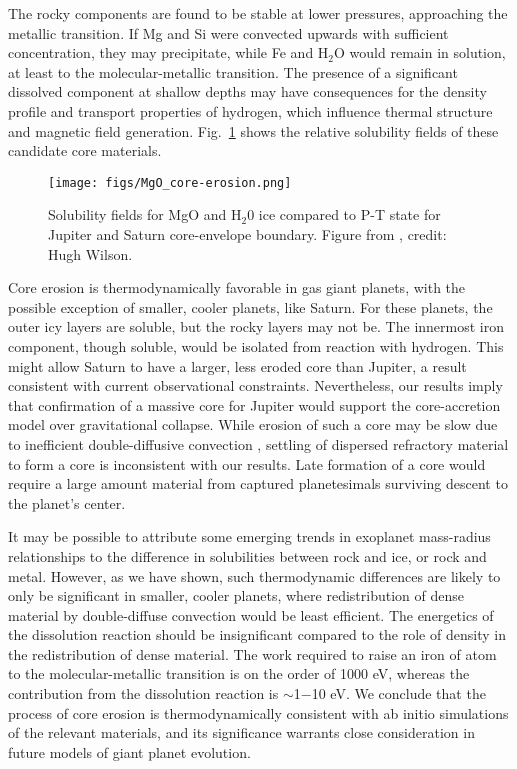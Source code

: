 The rocky components are found to be stable at lower pressures, approaching the
metallic transition. If Mg and Si were convected upwards with sufficient
concentration, they may precipitate, while Fe and $\mathrm{H}_2\mathrm{O}$
would remain in solution, at least to the molecular-metallic transition.  The
presence of a significant dissolved component at shallow depths may have
consequences for the density profile and transport properties of hydrogen,
which influence thermal structure and magnetic field generation.
Fig.~\ref{fig:mgoerosion} shows the relative solubility fields of these
candidate core materials.

 \begin{figure}[h] %
   \centering
   \texttt{[image: figs/MgO\_core-erosion.png]} 
\caption{ Solubility fields for MgO and H$_2$0 ice compared to P-T state for Jupiter and Saturn
    core-envelope boundary. Figure from \citet{wilson12b}, credit: Hugh Wilson.\label{fig:mgoerosion}}
\end{figure}

Core erosion is thermodynamically favorable in gas giant planets,
with the possible exception of smaller, cooler planets, like Saturn. For these planets, the
outer icy layers are soluble, but the rocky layers may not be. The innermost
iron component, though soluble, would be isolated from reaction with hydrogen.
This might allow Saturn to have a larger, less eroded core than
Jupiter, a result consistent with current observational constraints.
Nevertheless, our results imply
that confirmation of a massive core for Jupiter would support the
core-accretion model over gravitational collapse. While erosion of such a core
may be slow due to inefficient double-diffusive convection
\citep{Stevenson1982a,Chabrier2007,Leconte2012,Mirouh2012}, settling of dispersed
refractory material to form a core is inconsistent with our results. Late formation of a core
would require a large amount material from captured planetesimals
surviving descent to the planet's center.

It may be possible to attribute some
emerging trends in exoplanet mass-radius relationships to the difference in
solubilities between rock and ice, or rock and metal. However, as we have
shown, such thermodynamic differences are likely to only be significant in
smaller, cooler planets, where redistribution of dense material by
double-diffuse convection would be least efficient. The energetics of the
dissolution reaction should be insignificant compared to the role of density
in the redistribution of dense material. The work required to raise an iron of atom to
the molecular-metallic transition is on the order of 1000 eV, whereas the
contribution from the dissolution reaction is $\sim$1$-$10 eV. We conclude
that the process of core erosion is thermodynamically consistent with ab
initio simulations of the relevant materials, and its
significance warrants close consideration in future models of giant planet
evolution.




